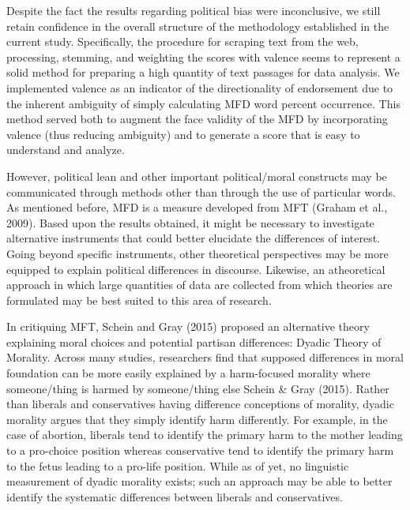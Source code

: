 \documentclass[
  english,
  man,floatsintext]{apa6}
\begin{document}
Despite the fact the results regarding political bias were inconclusive, we still retain confidence in the overall structure of the methodology established in the current study. Specifically, the procedure for scraping text from the web, processing, stemming, and weighting the scores with valence seems to represent a solid method for preparing a high quantity of text passages for data analysis. We implemented valence as an indicator of the directionality of endorsement due to the inherent ambiguity of simply calculating MFD word percent occurrence. This method served both to augment the face validity of the MFD by incorporating valence (thus reducing ambiguity) and to generate a score that is easy to understand and analyze.

However, political lean and other important political/moral constructs may be communicated through methods other than through the use of particular words. As mentioned before, MFD is a measure developed from MFT (Graham et al., 2009). Based upon the results obtained, it might be necessary to investigate alternative instruments that could better elucidate the differences of interest. Going beyond specific instruments, other theoretical perspectives may be more equipped to explain political differences in discourse. Likewise, an atheoretical approach in which large quantities of data are collected from which theories are formulated may be best suited to this area of research.

In critiquing MFT, Schein and Gray (2015) proposed an alternative theory explaining moral choices and potential partisan differences: Dyadic Theory of Morality. Across many studies, researchers find that supposed differences in moral foundation can be more easily explained by a harm-focused morality where someone/thing is harmed by someone/thing else Schein \& Gray (2015). Rather than liberals and conservatives having difference conceptions of morality, dyadic morality argues that they simply identify harm differently. For example, in the case of abortion, liberals tend to identify the primary harm to the mother leading to a pro-choice position whereas conservative tend to identify the primary harm to the fetus leading to a pro-life position. While as of yet, no linguistic measurement of dyadic morality exists; such an approach may be able to better identify the systematic differences between liberals and conservatives.
\end{document}
